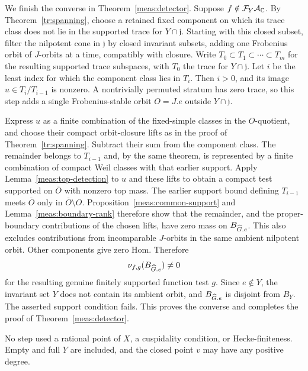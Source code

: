 We finish the converse in Theorem~\ref{meas:detector}. Suppose
$f\notin\mathcal F_Y\mathcal A_{\mathbb C}$. By Theorem~\ref{tr:spanning}, choose a
retained fixed component on which its trace class does not lie in the
supported trace for $Y\cap\mathfrak j$. Starting with this closed subset,
filter the nilpotent cone in $\mathfrak j$ by closed invariant subsets,
adding one Frobenius orbit of $J$-orbits at a time, compatibly with
closure. Write $T_0\subset T_1\subset\cdots\subset T_m$ for the resulting
supported trace subspaces, with $T_0$ the trace for $Y\cap\mathfrak j$.
Let $i$ be the least index for which the
component class lies in $T_i$. Then $i>0$, and its image
$u\in T_i/T_{i-1}$ is nonzero. A nontrivially permuted stratum has zero
trace, so this step adds a single Frobenius-stable orbit $O=J.e$ outside
$Y\cap\mathfrak j$.

Express $u$ as a finite combination of the fixed-simple classes in the
$O$-quotient, and choose their compact orbit-closure lifts as in the proof
of Theorem~\ref{tr:spanning}. Subtract their sum from the component
class. The remainder belongs to $T_{i-1}$ and, by the same theorem,
is represented by a finite combination of compact Weil classes with
that earlier support. Apply
Lemma~\ref{meas:top-detection} to $u$ and these lifts to obtain a compact
test supported on $\overline O$ with nonzero top mass. The earlier
support bound defining $T_{i-1}$ meets $\overline O$ only in
$\overline O\setminus O$. Proposition~\ref{meas:common-support} and
Lemma~\ref{meas:boundary-rank} therefore show that the remainder,
and the proper-boundary contributions of the chosen lifts, have zero
mass on $B_{\widehat G.e}$. This also excludes contributions from incomparable
$J$-orbits in the same ambient nilpotent orbit. Other components give
zero Hom. Therefore
\[
 \nu_{f,g}(B_{\widehat G.e})\ne0
\]
for the resulting genuine finitely supported function test $g$.
Since $e\notin Y$, the invariant set $Y$ does not contain its ambient
orbit, and $B_{\widehat G.e}$ is disjoint from $B_Y$.  The asserted support
condition fails.  This proves the converse and completes the proof of
Theorem~\ref{meas:detector}.

No step used a rational point of $X$, a cuspidality condition, or
Hecke-finiteness.  Empty and full $Y$ are included, and the closed point
$v$ may have any positive degree.
